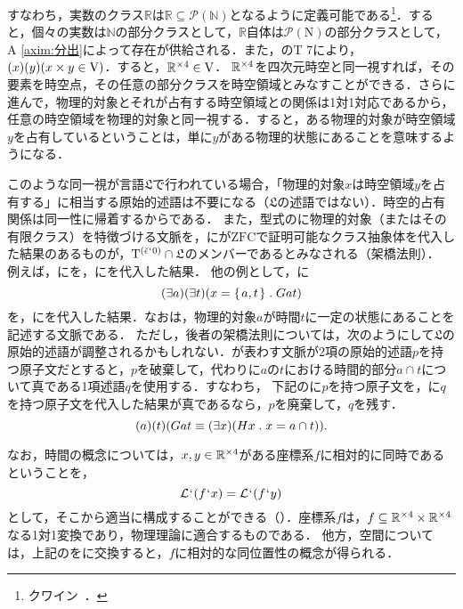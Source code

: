 すなわち，実数のクラス$\mathbb{R}$は$ \mathbb{R}\subseteq\mathcal{P}(\mathbb{N}) $となるように定義可能である\footnote{
    クワイン~\cite[pp.\,113--117]{クワインa}．
}．すると，個々の実数は$\mathbb{N}$の部分クラスとして，$\mathbb{R}$自体は$ \mathcal{P}(\mathrm{N}) $の部分クラスとして，A \ref{axim:分出}によって存在が供給される．また，のT 7により，$ (x)(y)(x\times y\in\mathrm{V}) $．すると，$ \mathbb{R}^{\times 4}\in\mathrm{V} $．
$ \mathbb{R}^{\times 4} $を四次元時空と同一視すれば，その要素を時空点，その任意の部分クラスを時空領域とみなすことができる．さらに進んで，物理的対象とそれが占有する時空領域との関係は1対1対応であるから，任意の時空領域を物理的対象と同一視する．すると，ある物理的対象が時空領域$y$を占有しているということは，単に$y$がある物理的状態にあることを意味するようになる．

このような同一視が言語$ \mathfrak{L} $で行われている場合，「物理的対象$x$は時空領域$y$を占有する」に相当する原始的述語は不要になる（$\mathfrak{L}$の述語ではない）．時空的占有関係は同一性に帰着するからである．
また，型式のに物理的対象（またはその有限クラス）を特徴づける文脈を，\kagi{$ \alpha $}に\kagi{$ \alpha\in\univ $}が$\mathrm{ZFC}$で証明可能なクラス抽象体を代入した結果のあるものが，$ \mathrm{T}^{(\breve{\epsilon}{\mspace{1mu}{`}\mspace{1mu}} 0)}\cap\mathfrak{L} $のメンバーであるとみなされる（架橋法則）．
例えば，にを，\kagi{$ \alpha $}にを代入した結果．
他の例として，に
\[
    (\exists a)(\exists t)(x = \classab{a,t}\con{1}Gat)
\]
を，\kagi{$ \alpha $}にを代入した結果．なおは，物理的対象$ a $が時間$ t $に一定の状態にあることを記述する文脈である．
ただし，後者の架橋法則については，次のようにして$ \mathfrak{L} $の原始的述語が調整されるかもしれない．が表わす文脈が2項の原始的述語$p$を持つ原子文だとすると，$p$を破棄して，代わりに$a$の$t$における時間的部分$a\cap t$について真である1項述語$q$を使用する．すなわち，
下記のに$p$を持つ原子文を，に$q$を持つ原子文を代入した結果が真であるなら，$p$を廃棄して，$q$を残す．
\[
    (a)(t)(Gat\case{3}{0}{0}(\exists x)(Hx\con{1}x = a\cap t)).
\]

なお，時間の概念については，$x,y\in\mathbb{R}^{\times 4}$がある座標系$f$に相対的に同時であるということを，
\[
    \mathcal{L}{\mspace{1mu}{`}\mspace{1mu}}(f{\mspace{1mu}{`}\mspace{1mu}} x) = \mathcal{L}{\mspace{1mu}{`}\mspace{1mu}}(f{\mspace{1mu}{`}\mspace{1mu}} y)
\]
として，そこから適当に構成することができる（）．座標系$f$は，$f\subseteq\mathbb{R}^{\times 4}\times\mathbb{R}^{\times 4}$なる1対1変換であり，物理理論に適合するものである．
他方，空間については，上記のをに交換すると，$f$に相対的な同位置性の概念が得られる．

